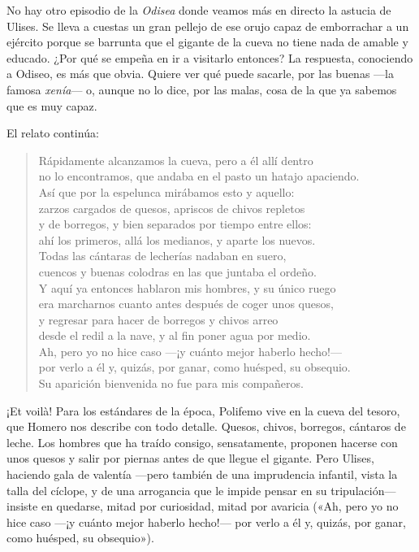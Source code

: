 \documentclass[11pt,a4paper]{article}
\begin{document}
No hay otro episodio de la \emph{Odisea} donde veamos más en directo la astucia de Ulises. Se lleva a cuestas un gran pellejo de ese orujo capaz de emborrachar a un ejército porque se barrunta que el gigante de la cueva no tiene nada de amable y educado. ¿Por qué se empeña en ir a visitarlo entonces? La respuesta, conociendo a Odiseo, es más que obvia. Quiere ver qué puede sacarle, por las buenas ---la famosa \emph{xenía}--- o, aunque no lo dice, por las malas, cosa de la que ya sabemos que es muy capaz.

El relato continúa:

\begin{verse}
Rápidamente alcanzamos la cueva, pero a él allí dentro\\
no lo encontramos, que andaba en el pasto un hatajo apaciendo.\\
Así que por la espelunca mirábamos esto y aquello:\\
zarzos cargados de quesos, apriscos de chivos repletos\\
y de borregos, y bien separados por tiempo entre ellos:\\
ahí los primeros, allá los medianos, y aparte los nuevos.\\
Todas las cántaras de lecherías nadaban en suero,\\
cuencos y buenas colodras en las que juntaba el ordeño.\\
Y aquí ya entonces hablaron mis hombres, y su único ruego\\
era marcharnos cuanto antes después de coger unos quesos,\\
y regresar para hacer de borregos y chivos arreo\\
desde el redil a la nave, y al fin poner agua por medio.\\
Ah, pero yo no hice caso ---¡y cuánto mejor haberlo hecho!---\\
por verlo a él y, quizás, por ganar, como huésped, su obsequio.\\
Su aparición bienvenida no fue para mis compañeros.
\end{verse}

¡Et voilà! Para los estándares de la época, Polifemo vive en la cueva del tesoro, que Homero nos describe con todo detalle. Quesos, chivos, borregos, cántaros de leche. Los hombres que ha traído consigo, sensatamente, proponen hacerse con unos quesos y salir por piernas antes de que llegue el gigante. Pero Ulises, haciendo gala de valentía ---pero también de una imprudencia infantil, vista la talla del cíclope, y de una arrogancia que le impide pensar en su tripulación--- insiste en quedarse, mitad por curiosidad, mitad por avaricia («Ah, pero yo no hice caso ---¡y cuánto mejor haberlo hecho!--- por verlo a él y, quizás, por ganar, como huésped, su obsequio»).
\end{document}
